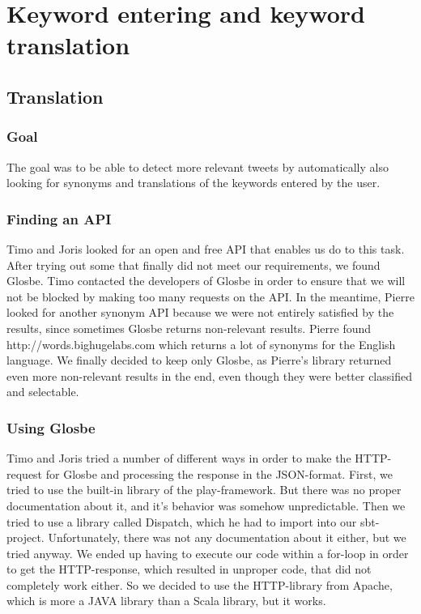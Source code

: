 \section{Keyword entering and keyword translation }
\subsection{Translation}
\subsubsection{Goal}
The goal was to be able to detect more relevant tweets by automatically also looking for synonyms and translations of the keywords entered by the user.

\subsubsection{Finding an API}

Timo and Joris looked for an open and free API that enables us do to this task. After trying out some that finally did not meet our requirements, we found Glosbe. Timo contacted the developers of Glosbe in order to ensure that we will not be blocked by making too many requests on the API. In the meantime, Pierre looked for another synonym API because we were not entirely satisfied by the results, since sometimes Glosbe returns non-relevant results. Pierre found http://words.bighugelabs.com which returns a lot of synonyms for the English language. We finally decided to keep only Glosbe, as Pierre's library returned even more non-relevant results in the end, even though they were better classified and selectable.

\subsubsection{Using Glosbe}

Timo and Joris tried a number of different ways in order to make the HTTP-request for Glosbe and processing the response in the JSON-format. First, we tried to use the built-in library of the play-framework. But there was no proper documentation about it, and it's behavior was somehow unpredictable. Then we tried to use a library called Dispatch, which he had to import into our sbt-project. Unfortunately, there was not any documentation about it either, but we tried anyway. We ended up having to execute our code within a for-loop in order to get the HTTP-response, which resulted in unproper code, that did not completely work either. So we decided to use the HTTP-library from Apache, which is more a JAVA library than a Scala library, but it works.

